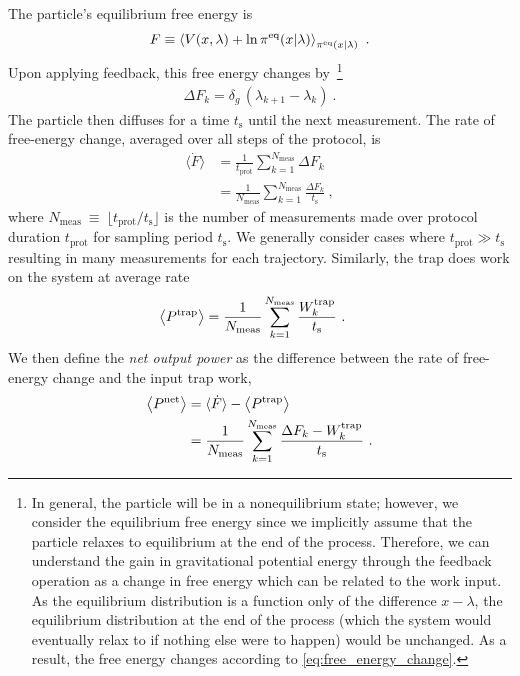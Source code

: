 \documentclass[%
reprint,
bibnotes, amsmath, amssymb, aps, pre,
 showkeys,
floatfix
]{revtex4-2}
\newcommand{\mrm}{\mathrm}
\newcommand{\ts}{t_{\mrm{s}}}
\newcommand{\wt}{W^{\mrm{trap}}}
\newcommand{\ept}{\ev{P^{\mrm{trap}}}}
\newcommand{\epg}{\langle\dot{F}\rangle}
\newcommand{\epn}{\ev{P^{\mrm{net}}}}
\begin{document}
The particle's equilibrium free energy is 
\begin{align}
    F \equiv 
        \ev{ 
            V(x,\lambda) + \ln \pi^{\mrm{eq}} ( x | \lambda ) 
        }_{\pi^{\mrm{eq}}(x|\lambda)} \ .
\label{eq:free_energy}
\end{align}
Upon applying feedback, this free energy changes by~\footnote{In general, the particle will be in a nonequilibrium state; however, we consider the equilibrium free energy since we implicitly assume that the particle relaxes to equilibrium at the end of the process. 
Therefore, we can understand the gain in gravitational potential energy through the feedback operation as a change in free energy which can be related to the work input. 
As the equilibrium distribution is a function only of the difference $x-\lambda$, the equilibrium distribution at the end of the process (which the system would eventually relax to if nothing else were to happen) would be unchanged.
As a result, the free energy changes according to \eqref{eq:free_energy_change}.}
\begin{align}
    \Delta F_{k} = \delta_g \, (\lambda_{k+1} - \lambda_k)\ . \label{eq:free_energy_change}
\end{align}
The particle then diffuses for a time $\ts$ until the next measurement.  
The rate of free-energy change, averaged over all steps of the protocol, is 
\begin{subequations}
    \begin{align}
        \epg &= \frac{1}{t_{\mrm{prot}}}\sum_{k=1}^{N_{\mrm{meas}}} \Delta F_k\\
        &= \frac{1}{N_{\mrm{meas}}}\sum_{k=1}^{N_{\mrm{meas}}}\frac{\Delta F_k}{\ts}\ , \label{eq:nat_pgrav_def}
    \end{align}
\end{subequations}
where $N_{\mrm{meas}}~\equiv~\lfloor t_{\mrm{prot}}/\ts \rfloor$ is the number of measurements made over protocol duration $t_{\mrm{prot}}$ for sampling period $\ts$.
We generally consider cases where $t_{\mrm{prot}} \gg \ts$ resulting in many measurements for each trajectory.
Similarly, the trap does work on the system at average rate
\begin{align}
    \ept &= \frac{1}{N_{\mrm{meas}}}\sum_{k=1}^{N_{\mrm{meas}}}\frac{\wt_{k}}{\ts} \ . \label{eq:nat_ptrap_def}
\end{align}
We then define the \textit{net output power} as the difference between the rate of free-energy change and the input trap work,
\begin{subequations}
    \begin{align}
        \epn &= \epg - \ept \\
        &= \frac{1}{N_{\mrm{meas}}}\sum_{k=1}^{N_{\mrm{meas}}}\frac{\Delta F_{k}-\wt_{k}}{\ts} \ .\label{eq:nat_pnet_def}
    \end{align}
\end{subequations}
\end{document}
